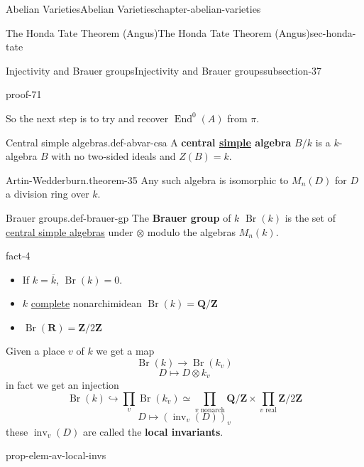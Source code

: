 \documentclass[oneside,10pt,]{book}
\newcommand{\terminology}[1]{\textbf{#1}}
\numberwithin{equation}{section}
\newcommand{\ZZ}{\mathbf{Z}}
\newcommand{\QQ}{\mathbf{Q}}
\newcommand{\RR}{\mathbf{R}}
\DeclareMathOperator{\End}{End}
\begin{document}
\begin{chapterptx}{Abelian Varieties}{}{Abelian Varieties}{}{}{chapter-abelian-varieties}
\begin{sectionptx}{The Honda Tate Theorem (Angus)}{}{The Honda Tate Theorem (Angus)}{}{}{sec-honda-tate}
\begin{subsectionptx}{Injectivity and Brauer groups}{}{Injectivity and Brauer groups}{}{}{subsection-37}
\begin{proofptx}{}{proof-71}
\end{proofptx}
\hypertarget{p-420}{}%
So the next step is to try and recover \(\End^0(A)\) from \(\pi\).%
\begin{definition}{Central simple algebras.}{def-abvar-csa}%
\hypertarget{p-421}{}%
A \terminology{central \hyperref[def-simple-av]{simple} algebra} \(B/k\) is a \(k\)-algebra \(B\) with no two-sided ideals and \(Z(B) = k\).%
\end{definition}
\begin{theorem}{Artin-Wedderburn.}{}{theorem-35}%
\hypertarget{p-422}{}%
Any such algebra is isomorphic to \(M_n(D)\) for \(D\) a division ring over \(k\).%
\end{theorem}
\begin{definition}{Brauer groups.}{def-brauer-gp}%
\hypertarget{p-423}{}%
The \terminology{Brauer group} of \(k\) \(\operatorname{Br}(k)\) is the set of \hyperref[def-abvar-csa]{central \hyperref[def-simple-av]{simple} algebras} under \(\otimes\) modulo the algebras \(M_n(k)\).%
\end{definition}
\begin{fact}{}{}{fact-4}%
\hypertarget{p-424}{}%
\leavevmode%
\begin{itemize}[label=\textbullet]
\item{}If \(k = \overline k\), \(\operatorname{Br}(k) = 0\).%
\item{}\(k\) \hyperref[def-abelian-complete-var]{complete} nonarchimidean \(\operatorname{Br}(k) = \QQ/\ZZ\)%
\item{}\(\operatorname{Br}(\RR) = \ZZ/2\ZZ\)%
\end{itemize}
Given a place \(v\) of \(k\) we get a map%
\begin{equation*}
\operatorname{Br}(k) \to \operatorname{Br}(k_v)
\end{equation*}
%
\begin{equation*}
D \mapsto D\otimes k_v
\end{equation*}
in fact we get an injection%
\begin{equation*}
\operatorname{Br}(k) \hookrightarrow \prod_v \operatorname{Br}(k_v) \simeq \prod_{v\text{ nonarch}} \QQ/\ZZ \times \prod_{v\text{ real}} \ZZ/2\ZZ
\end{equation*}
%
\begin{equation*}
D\mapsto (\operatorname{inv}_v(D))_v
\end{equation*}
these \(\operatorname{inv}_v(D)\) are called the \terminology{local invariants}.%
\end{fact}
\begin{proposition}{}{}{prop-elem-av-local-invs}%

\end{proposition}
\end{subsectionptx}
\end{sectionptx}
\end{chapterptx}
\end{document}
